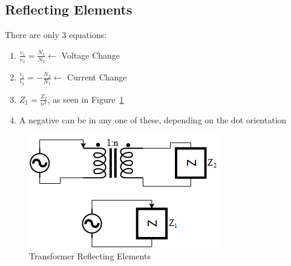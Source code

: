 \documentclass[10pt,letterpaper,final,twoside,notitlepage]{article}
\begin{document}
	\subsection*{Reflecting Elements} \label{subsec:Element Reflection}
		There are only 3 equations:
		\begin{enumerate}
			\item $\frac{v_{1}}{v_{2}} = \frac{N_{1}}{N_{2}} \longleftarrow$ Voltage Change
			\item $\frac{i_{1}}{i_{2}} = -\frac{N_{2}}{N_{1}} \longleftarrow$ Current Change
			\item $Z_{1} = \frac{Z_{2}}{n^{2}}$, as seen in Figure~\ref{fig:Transformer Reflecting}
			\item A negative can be in any one of these, depending on the dot orientation
		\end{enumerate}
		\begin{figure}[ht!]
			\centering
			\includegraphics[scale=0.375]{Transformer_Reflecting.png}
			\caption{Transformer Reflecting Elements}
			\label{fig:Transformer Reflecting}
		\end{figure}
		\vspace{-10mm}
	
\end{document}
